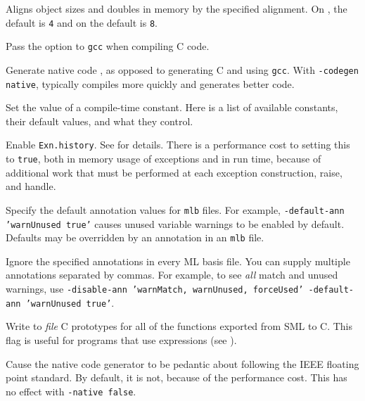 \begin{description}

Aligns object sizes and doubles in memory by the specified alignment.
On {\intel}, the default is {\tt 4} and on {\sparc} the default is
{\tt 8}.

Pass the option to {\tt gcc} when compiling C code.

Generate native code , as opposed to generating C and using {\tt gcc}.
With {\tt -codegen native}, {\mlton} typically compiles more quickly and
generates better code.

Set the value of a compile-time constant.  Here is a list of available
constants, their default values, and what they control.

\vspace{0em} %
\begin{description}

Enable {\tt Exn.history}.  See  for details.  There is a
performance cost to setting this to {\tt true}, both in memory usage
of exceptions and in run time, because of additional work that must be
performed at each exception construction, raise, and handle.

\end{description}

Specify the default annotation values for {\tt mlb} files.  For
example, {\tt -default-ann 'warnUnused true'} causes unused variable
warnings to be enabled by default.  Defaults may be overridden by an
annotation in an {\tt mlb} file.

Ignore the specified annotations in every ML basis file.  You can
supply multiple annotations separated by commas.  For example, to see
{\em all} match and unused warnings, use {\tt -disable-ann 'warnMatch,
warnUnused, forceUsed' -default-ann 'warnUnused true'}.

Write to {\it file} C prototypes for all of the functions exported
from SML to C.  This flag is useful for programs that use {\export}
expressions (see ).

Cause the native code generator to be pedantic about following the
IEEE floating point standard.  By default, it is not, because of the
performance cost.  This has no effect with {\tt -native false}.


\end{description}
